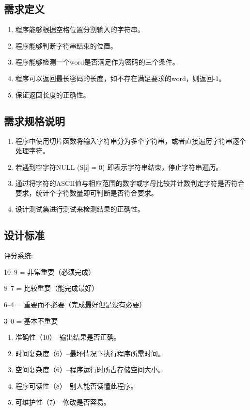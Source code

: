\begin{spacing}{1.5}
    \subsection{需求定义}
    \begin{enumerate} [\indent 1、]
        \item 程序能够根据空格位置分割输入的字符串。
        \item 程序能够判断字符串结束的位置。
        \item 程序能够检测一个word是否满足作为密码的三个条件。
        \item 程序可以返回最长密码的长度，如不存在满足要求的word，则返回-1。
        \item 保证返回长度的正确性。
    \end{enumerate}

    \subsection{需求规格说明}
    \begin{enumerate} [\indent 1、]
        \item 程序中使用切片函数将输入字符串分为多个字符串，或者直接遍历字符串逐个处理字符。
        \item 若遇到空字符NULL (S[i] = 0) 即表示字符串结束，停止字符串遍历。
        \item 通过将字符的ASCII值与相应范围的数字或字母比较并计数判定字符是否符合要求，统计个字符数量即可判断是否符合要求。
        \item 设计测试集进行测试来检测结果的正确性。
    \end{enumerate}
    
    \subsection{设计标准}
    评分系统:

    10--9 = 非常重要（必须完成）
    
    8--7 = 比较重要（能完成最好）
    
    6--4 = 重要而不必要（完成最好但是没有必要）
    
    3--0 = 基本不重要

    \begin{enumerate} [\indent 1、]
        \item 准确性（10）--输出结果是否正确。
        \item 时间复杂度（6）--最坏情况下执行程序所需时间。
        \item 空间复杂度（6）--程序运行时所占存储空间大小。
        \item 程序可读性（8）--别人能否读懂此程序。
        \item 可维护性（7）--修改是否容易。
    \end{enumerate}


\end{spacing}
